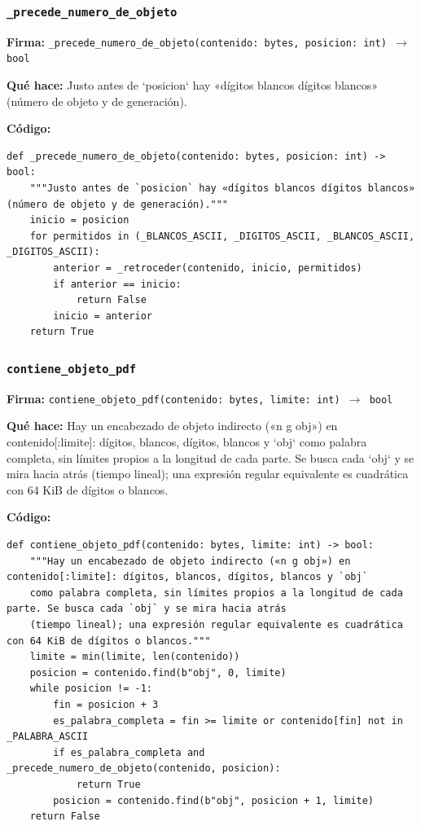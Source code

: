 \documentclass[11pt,a4paper]{article}
\begin{document}
\subsubsection*{\texttt{\_precede\_numero\_de\_objeto}}
\textbf{Firma:} \texttt{\_precede\_numero\_de\_objeto(contenido: bytes, posicion: int) $\rightarrow$ bool}

\textbf{Qué hace:} Justo antes de `posicion` hay «dígitos blancos dígitos blancos» (número de objeto y de generación).

\textbf{Código:}
\begin{lstlisting}
def _precede_numero_de_objeto(contenido: bytes, posicion: int) -> bool:
    """Justo antes de `posicion` hay «dígitos blancos dígitos blancos» (número de objeto y de generación)."""
    inicio = posicion
    for permitidos in (_BLANCOS_ASCII, _DIGITOS_ASCII, _BLANCOS_ASCII, _DIGITOS_ASCII):
        anterior = _retroceder(contenido, inicio, permitidos)
        if anterior == inicio:
            return False
        inicio = anterior
    return True
\end{lstlisting}

\subsubsection*{\texttt{contiene\_objeto\_pdf}}
\textbf{Firma:} \texttt{contiene\_objeto\_pdf(contenido: bytes, limite: int) $\rightarrow$ bool}

\textbf{Qué hace:} Hay un encabezado de objeto indirecto («n g obj») en contenido[:limite]: dígitos, blancos, dígitos, blancos y `obj`
como palabra completa, sin límites propios a la longitud de cada parte. Se busca cada `obj` y se mira hacia atrás
(tiempo lineal); una expresión regular equivalente es cuadrática con 64 KiB de dígitos o blancos.

\textbf{Código:}
\begin{lstlisting}
def contiene_objeto_pdf(contenido: bytes, limite: int) -> bool:
    """Hay un encabezado de objeto indirecto («n g obj») en contenido[:limite]: dígitos, blancos, dígitos, blancos y `obj`
    como palabra completa, sin límites propios a la longitud de cada parte. Se busca cada `obj` y se mira hacia atrás
    (tiempo lineal); una expresión regular equivalente es cuadrática con 64 KiB de dígitos o blancos."""
    limite = min(limite, len(contenido))
    posicion = contenido.find(b"obj", 0, limite)
    while posicion != -1:
        fin = posicion + 3
        es_palabra_completa = fin >= limite or contenido[fin] not in _PALABRA_ASCII
        if es_palabra_completa and _precede_numero_de_objeto(contenido, posicion):
            return True
        posicion = contenido.find(b"obj", posicion + 1, limite)
    return False
\end{lstlisting}
\end{document}

